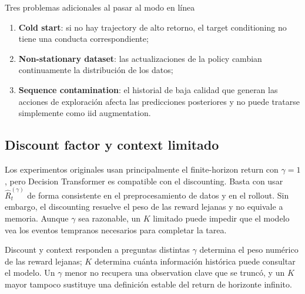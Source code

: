 \begin{warningbox}{Tres problemas adicionales al pasar al modo en línea}
\begin{enumerate}
  \item \textbf{Cold start}: si no hay trajectory de alto retorno, el target conditioning no tiene una conducta correspondiente;
  \item \textbf{Non-stationary dataset}: las actualizaciones de la policy cambian continuamente la distribución de los datos;
  \item \textbf{Sequence contamination}: el historial de baja calidad que generan las acciones de exploración afecta las predicciones posteriores y no puede tratarse simplemente como iid augmentation.
\end{enumerate}
\end{warningbox}


\subsection{Discount factor y context limitado}

Los experimentos originales usan principalmente el finite-horizon return con $\gamma=1$, pero Decision Transformer es compatible con el discounting. Basta con usar $\widehat{R}^{(\gamma)}_t$ de forma consistente en el preprocesamiento de datos y en el rollout. Sin embargo, el discounting resuelve el peso de las reward lejanas y no equivale a memoria. Aunque $\gamma$ sea razonable, un $K$ limitado puede impedir que el modelo vea los eventos tempranos necesarios para completar la tarea.

\begin{importantbox}{Discount y context responden a preguntas distintas}
$\gamma$ determina el peso numérico de las reward lejanas; $K$ determina cuánta información histórica puede consultar el modelo. Un $\gamma$ menor no recupera una observation clave que se truncó, y un $K$ mayor tampoco sustituye una definición estable del return de horizonte infinito.
\end{importantbox}

